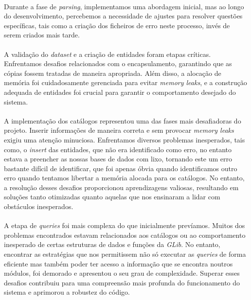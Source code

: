 \documentclass{article}
\begin{document}
\paragraph{}Durante a fase de \textit{parsing}, implementamos uma abordagem inicial, mas ao longo do desenvolvimento, percebemos a necessidade de ajustes para resolver questões específicas, tais como a criação dos ficheiros de erro neste processo, invés de serem criados mais tarde. 

\paragraph{}A validação do \textit{dataset} e a criação de entidades foram etapas críticas. Enfrentamos desafios relacionados com o encapsulamento, garantindo que as cópias fossem tratadas de maneira apropriada. Além disso, a alocação de memória foi cuidadosamente gerenciada para evitar \textit{memory leaks}, e a construção adequada de entidades foi crucial para garantir o comportamento desejado do sistema.

\paragraph{}A implementação dos catálogos representou uma das fases mais desafiadoras do projeto. Inserir informações de maneira correta e sem provocar \textit{memory leaks} exigiu uma atenção minuciosa. Enfrentamos diversos problemas inesperados, tais como, o \textit{insert} das entidades, que não era identificado como erro, no entanto estava a preencher as nossas bases de dados com lixo, tornando este um erro bastante difícil de identificar, que foi apenas óbvia quando identificamos outro erro quando tentamos libertar a memória alocada para os catálogos. No entanto, a resolução desses desafios proporcionou aprendizagens valiosas, resultando em soluções tanto otimizadas quanto aquelas que nos ensinaram a lidar com obstáculos inesperados.

\paragraph{}A etapa de \textit{queries} foi mais complexa do que inicialmente prevíamos. Muitos dos problemas encontrados estavam relacionados aos catálogos ou ao comportamento inesperado de certas estruturas de dados e funções da \textit{GLib}. No entanto, encontrar as estratégias que nos permitissem não só executar as \textit{queries} de forma eficiente mas também poder ter acesso a informação que se encontra noutros módulos, foi demorado e apresentou o seu grau de complexidade. Superar esses desafios contribuiu para uma compreensão mais profunda do funcionamento do sistema e aprimorou a robustez do código.
\end{document}
